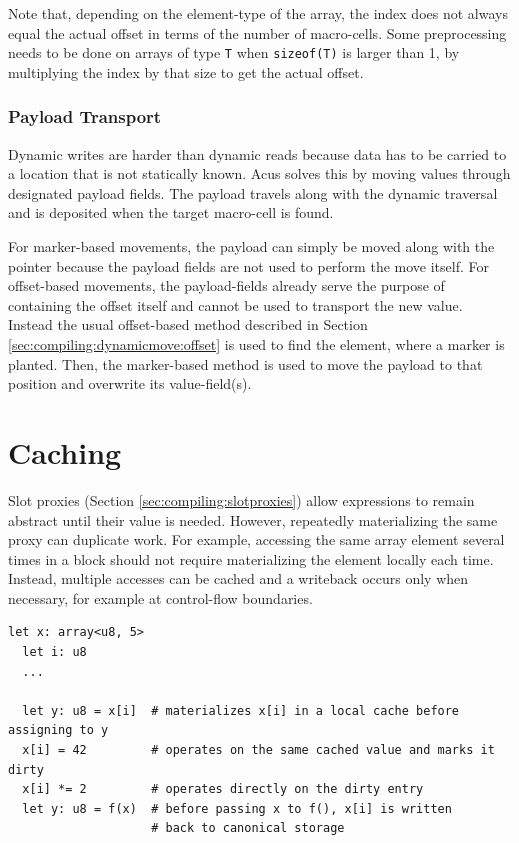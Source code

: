 Note that, depending on the element-type of the array, the index does not always equal the actual offset in terms of the number of macro-cells. Some preprocessing needs to be done on arrays of type \texttt{T} when \texttt{sizeof(T)} is larger than 1, by multiplying the index by that size to get the actual offset.

\subsection{Payload Transport}
Dynamic writes are harder than dynamic reads because data has to be carried to a location that is not statically known. Acus solves this by moving values through designated payload fields. The payload travels along with the dynamic traversal and is deposited when the target macro-cell is found.

For marker-based movements, the payload can simply be moved along with the pointer because the payload fields are not used to perform the move itself. For offset-based movements, the payload-fields already serve the purpose of containing the offset itself and cannot be used to transport the new value. Instead the usual offset-based method described in Section \ref{sec:compiling:dynamicmove:offset} is used to find the element, where a marker is planted. Then, the marker-based method is used to move the payload to that position and overwrite its value-field(s).

\chapter{Caching} \label{sec:compiling:cache}
Slot proxies (Section \ref{sec:compiling:slotproxies}) allow expressions to remain abstract until their value is needed. However, repeatedly materializing the same proxy can duplicate work. For example, accessing the same array element several times in a block should not require materializing the element locally each time. Instead, multiple accesses can be cached and a writeback occurs only when necessary, for example at control-flow boundaries.

\vspace{0.5cm}\noindent\begin{minipage}{\textwidth}
\begin{lstlisting}[style=pseudocode]
  let x: array<u8, 5>
  let i: u8
  ...

  let y: u8 = x[i]  # materializes x[i] in a local cache before assigning to y
  x[i] = 42         # operates on the same cached value and marks it dirty
  x[i] *= 2         # operates directly on the dirty entry
  let y: u8 = f(x)  # before passing x to f(), x[i] is written
                    # back to canonical storage
\end{lstlisting}
\end{minipage}

